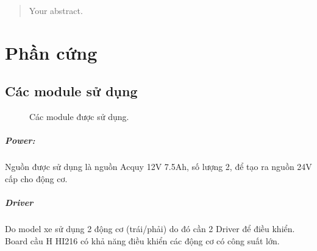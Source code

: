 \documentclass[a4paper, 12pt]{article}
\begin{document}
\tableofcontents
\begin{abstract}
Your abstract.
\end{abstract}
\section{Phần cứng}
\subsection{Các module sử dụng}
\begin{figure}[h]%
	\centering
	\qquad
	\qquad
	\quad
	\quad
	\quad
	
	\caption{Các module được sử dụng.}
	\label{3figs}
\end{figure}
\subparagraph{Power:}
Nguồn được sử dụng là nguồn Acquy 12V 7.5Ah, số lượng 2, để tạo ra nguồn 24V cấp cho động cơ.
\subparagraph{Driver}
Do model xe sử dụng 2 động cơ (trái/phải) do đó cần 2 Driver để điều khiển. Board cầu H HI216 có khả năng điều khiển các động cơ có công suất lớn.
\end{document}
